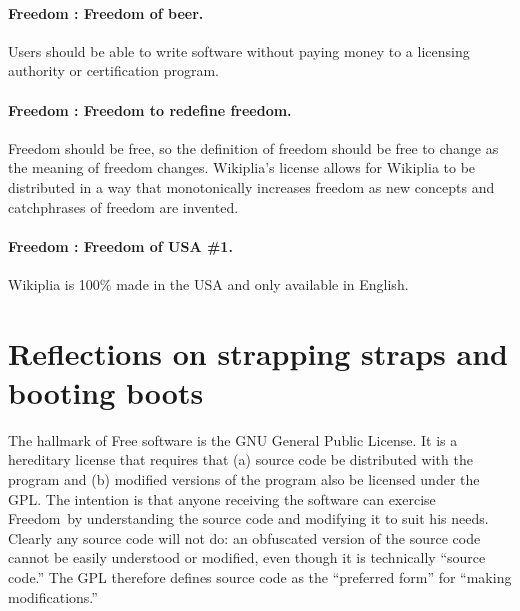 \documentclass[twocolumn]{article}
\begin{document}

\paragraph{Freedom \fbeer: Freedom of beer.}
Users should be able to write software without paying money to a
licensing authority or certification program.

\paragraph{Freedom \ffree: Freedom to redefine freedom.}
Freedom should be free, so the definition of freedom should be free to
change as the meaning of freedom changes. Wikiplia's license allows
for Wikiplia to be distributed in a way that monotonically increases
freedom as new concepts and catchphrases of freedom are invented.

\paragraph{Freedom \fusa: Freedom of USA \#1.}
Wikiplia is 100\% made in the USA and only available in
English.\z{}


\section{Reflections on strapping straps and booting boots} \label{sec:bootstrap}

The hallmark of Free software is the GNU General Public License. It is
a hereditary license that requires that (a) source code be distributed
with the program and (b) modified versions of the program also be
licensed under the GPL. The intention is that anyone receiving the
software can exercise Freedom~\ftinker by understanding the source
code and modifying it to suit his needs. Clearly any source code will
not do: an obfuscated version of the source
code cannot be easily understood or modified, even though it is
technically ``source code.'' The GPL therefore defines source code as
the ``preferred form'' for ``making modifications.''
\end{document}

